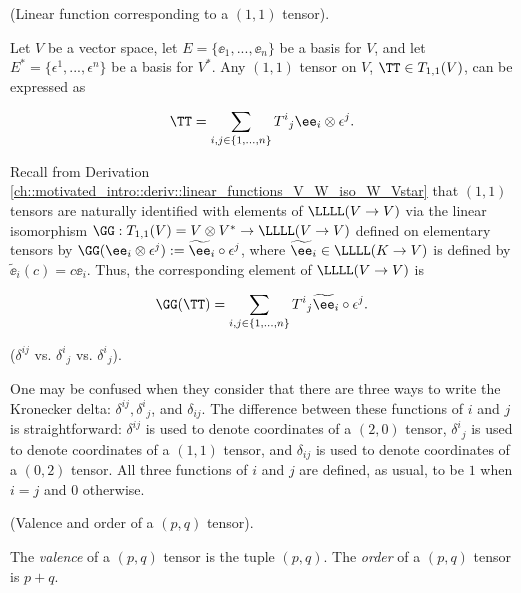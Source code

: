 \begin{example}
\label{ch::motivated_intro::thm::linear_fn_cooresp_to_1_1_tensor}
    (Linear function corresponding to a $(1, 1)$ tensor).

    Let $V$ be a vector space, let $E = \{\ee_1, ..., \ee_n\}$ be a basis for $V$, and let $E^* = \{\epsilon^1, ..., \epsilon^n\}$ be a basis for $V^*$. Any $(1, 1)$ tensor on $V$, $\TT \in T_{1,1}(V)$, can be expressed as

    \begin{align*}
        \TT = \sum_{i,j \in \{1, ..., n\}} T^i{}_j \ee_i \otimes \epsilon^j.
    \end{align*}

    Recall from Derivation \ref{ch::motivated_intro::deriv::linear_functions_V_W_iso_W_Vstar} that $(1, 1)$ tensors are naturally identified with elements of $\LLLL(V \rightarrow V)$ via the linear isomorphism $\GG:T_{1,1}(V) = V \otimes V^* \rightarrow \LLLL(V \rightarrow V)$ defined on elementary tensors by $\GG(\ee_i \otimes \epsilon^j) := \widetilde{\ee}_i \circ \epsilon^j$, where $\widetilde{\ee}_i \in \LLLL(K \rightarrow V)$ is defined by $\widetilde{\ee}_i(c) = c\ee_i$. Thus, the corresponding element of $\LLLL(V \rightarrow V)$ is

    \begin{align*}
        \GG(\TT) = \sum_{i,j \in \{1, ..., n\}} T^i{}_j \widetilde{\ee}_i \circ \epsilon^j.
    \end{align*}
\end{example}

\begin{remark}
    ($\delta^{ij}$ vs. $\delta^i{}_j$ vs. $\delta^i{}_j$).
    
    One may be confused when they consider that there are three ways to write the Kronecker delta: $\delta^{ij}, \delta^i{}_j$, and $\delta_{ij}$. The difference between these functions of $i$ and $j$ is straightforward: $\delta^{ij}$ is used to denote coordinates of a $(2, 0)$ tensor, $\delta^i{}_j$ is used to denote coordinates of a $(1, 1)$ tensor, and $\delta_{ij}$ is used to denote coordinates of a $(0, 2)$ tensor. All three functions of $i$ and $j$ are defined, as usual, to be $1$ when $i = j$ and $0$ otherwise.
\end{remark}

\begin{defn}
    (Valence and order of a $(p, q)$ tensor). 
    
    The \textit{valence} of a $(p, q)$ tensor is the tuple $(p, q)$. The \textit{order} of a $(p, q)$ tensor is $p + q$.
\end{defn}

